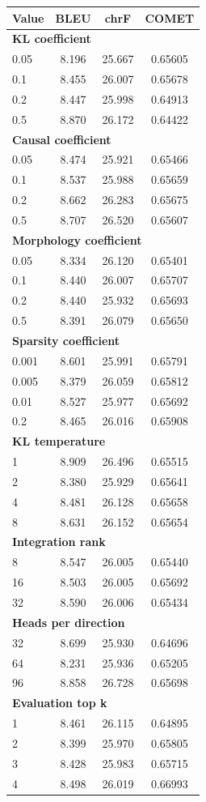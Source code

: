 \begingroup
\fontsize{7}{8.4}\selectfont
\setlength{\tabcolsep}{3pt}
\begin{tabular}{lccc}
\toprule
\textbf{Value} & \textbf{BLEU} & \textbf{chrF} & \textbf{COMET} \\
\midrule
\multicolumn{4}{l}{\textbf{KL coefficient}} \\
0.05 & 8.196 & 25.667 & 0.65605 \\
0.1 & 8.455 & 26.007 & 0.65678 \\
0.2 & 8.447 & 25.998 & 0.64913 \\
0.5 & 8.870 & 26.172 & 0.64422 \\
\multicolumn{4}{l}{\textbf{Causal coefficient}} \\
0.05 & 8.474 & 25.921 & 0.65466 \\
0.1 & 8.537 & 25.988 & 0.65659 \\
0.2 & 8.662 & 26.283 & 0.65675 \\
0.5 & 8.707 & 26.520 & 0.65607 \\
\multicolumn{4}{l}{\textbf{Morphology coefficient}} \\
0.05 & 8.334 & 26.120 & 0.65401 \\
0.1 & 8.440 & 26.007 & 0.65707 \\
0.2 & 8.440 & 25.932 & 0.65693 \\
0.5 & 8.391 & 26.079 & 0.65650 \\
\multicolumn{4}{l}{\textbf{Sparsity coefficient}} \\
0.001 & 8.601 & 25.991 & 0.65791 \\
0.005 & 8.379 & 26.059 & 0.65812 \\
0.01 & 8.527 & 25.977 & 0.65692 \\
0.2 & 8.465 & 26.016 & 0.65908 \\
\multicolumn{4}{l}{\textbf{KL temperature}} \\
1 & 8.909 & 26.496 & 0.65515 \\
2 & 8.380 & 25.929 & 0.65641 \\
4 & 8.481 & 26.128 & 0.65658 \\
8 & 8.631 & 26.152 & 0.65654 \\
\multicolumn{4}{l}{\textbf{Integration rank}} \\
8 & 8.547 & 26.005 & 0.65440 \\
16 & 8.503 & 26.005 & 0.65692 \\
32 & 8.590 & 26.006 & 0.65434 \\
\multicolumn{4}{l}{\textbf{Heads per direction}} \\
32 & 8.699 & 25.930 & 0.64696 \\
64 & 8.231 & 25.936 & 0.65205 \\
96 & 8.858 & 26.728 & 0.65698 \\
\multicolumn{4}{l}{\textbf{Evaluation top k}} \\
1 & 8.461 & 26.115 & 0.64895 \\
2 & 8.399 & 25.970 & 0.65805 \\
3 & 8.428 & 25.983 & 0.65715 \\
4 & 8.498 & 26.019 & 0.66993 \\
\bottomrule
\end{tabular}
\endgroup
